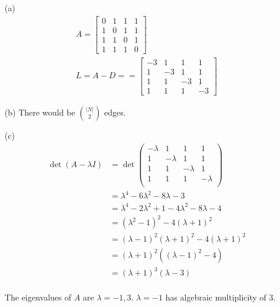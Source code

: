 \documentclass{article}
\begin{document}
\begin{enumerate}
  \item[(a)]
  \begin{gather*}
    A =
    \begin{bmatrix}
      0 & 1 & 1 & 1 \\
      1 & 0 & 1 & 1 \\
      1 & 1 & 0 & 1 \\
      1 & 1 & 1 & 0
    \end{bmatrix} \\
    L = A - D =
    = \boxed{
      \begin{bmatrix}
        -3 & 1 & 1 & 1 \\
        1 & -3 & 1 & 1 \\
        1 & 1 & -3 & 1 \\
        1 & 1 & 1 & -3
      \end{bmatrix}
    }
  \end{gather*}

  \item[(b)]
  There would be \( \binom{|N|}{2} \) edges.

  \item[(c)]
  \begin{align*}
    \det(A - \lambda I) &= \det
    \begin{pmatrix}
      -\lambda & 1 & 1 & 1 \\
      1 & -\lambda & 1 & 1 \\
      1 & 1 & -\lambda & 1 \\
      1 & 1 & 1 & -\lambda \\
    \end{pmatrix} \\
    &= \lambda^4 - 6\lambda^2 - 8\lambda - 3 \\
    &= \lambda^4 - 2\lambda^2 + 1 - 4\lambda^2 - 8\lambda - 4 \\
    &= (\lambda^2 - 1)^2 - 4(\lambda + 1)^2 \\
    &= (\lambda - 1)^2 (\lambda + 1)^2 - 4(\lambda + 1)^2 \\
    &= (\lambda + 1)^2 ((\lambda - 1)^2 - 4) \\
    &= (\lambda + 1)^3 (\lambda - 3) \\
  \end{align*}

  The eigenvalues of \( A \) are \( \lambda = -1, 3 \). \( \lambda = -1 \) has
  algebraic multiplicity of 3.


\end{enumerate}
\end{document}
